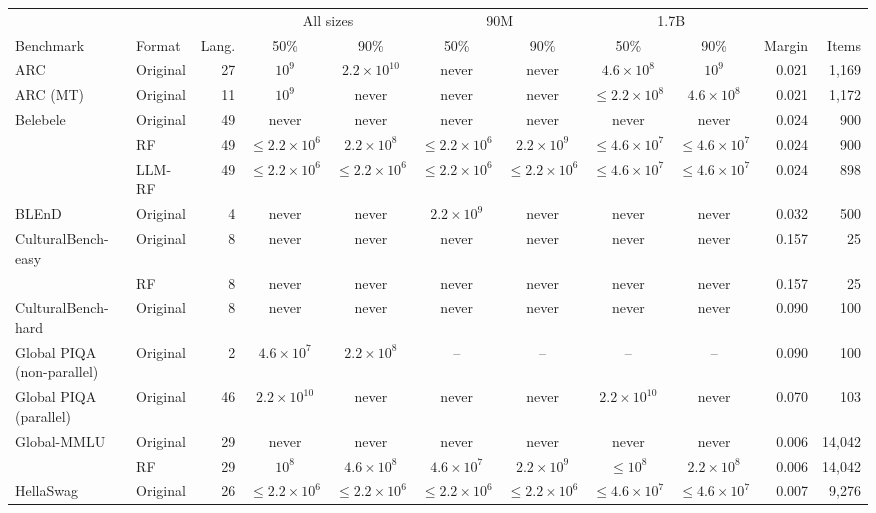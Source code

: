 \begin{tabular}{llrccccccrr}
\toprule
 & & & \multicolumn{2}{c}{All sizes} & \multicolumn{2}{c}{90M} & \multicolumn{2}{c}{1.7B} & & \\
\cmidrule(lr){4-5}\cmidrule(lr){6-7}\cmidrule(lr){8-9}
Benchmark & Format & Lang. & 50\% & 90\% & 50\% & 90\% & 50\% & 90\% & Margin & Items \\
\midrule
ARC & Original & 27 & $10^{9}$ & $2.2\times10^{10}$ & never & never & $4.6\times10^{8}$ & $10^{9}$ & 0.021 & 1{,}169 \\
\addlinespace
ARC (MT) & Original & 11 & $10^{9}$ & never & never & never & $\leq 2.2\times10^{8}$ & $4.6\times10^{8}$ & 0.021 & 1{,}172 \\
\addlinespace
Belebele & Original & 49 & never & never & never & never & never & never & 0.024 & 900 \\
 & RF & 49 & $\leq 2.2\times10^{6}$ & $2.2\times10^{8}$ & $\leq 2.2\times10^{6}$ & $2.2\times10^{9}$ & $\leq 4.6\times10^{7}$ & $\leq 4.6\times10^{7}$ & 0.024 & 900 \\
 & LLM-RF & 49 & $\leq 2.2\times10^{6}$ & $\leq 2.2\times10^{6}$ & $\leq 2.2\times10^{6}$ & $\leq 2.2\times10^{6}$ & $\leq 4.6\times10^{7}$ & $\leq 4.6\times10^{7}$ & 0.024 & 898 \\
\addlinespace
BLEnD & Original & 4 & never & never & $2.2\times10^{9}$ & never & never & never & 0.032 & 500 \\
\addlinespace
CulturalBench-easy & Original & 8 & never & never & never & never & never & never & 0.157 & 25 \\
 & RF & 8 & never & never & never & never & never & never & 0.157 & 25 \\
\addlinespace
CulturalBench-hard & Original & 8 & never & never & never & never & never & never & 0.090 & 100 \\
\addlinespace
Global PIQA (non-parallel) & Original & 2 & $4.6\times10^{7}$ & $2.2\times10^{8}$ & -- & -- & -- & -- & 0.090 & 100 \\
\addlinespace
Global PIQA (parallel) & Original & 46 & $2.2\times10^{10}$ & never & never & never & $2.2\times10^{10}$ & never & 0.070 & 103 \\
\addlinespace
Global-MMLU & Original & 29 & never & never & never & never & never & never & 0.006 & 14{,}042 \\
 & RF & 29 & $10^{8}$ & $4.6\times10^{8}$ & $4.6\times10^{7}$ & $2.2\times10^{9}$ & $\leq 10^{8}$ & $2.2\times10^{8}$ & 0.006 & 14{,}042 \\
\addlinespace
HellaSwag & Original & 26 & $\leq 2.2\times10^{6}$ & $\leq 2.2\times10^{6}$ & $\leq 2.2\times10^{6}$ & $\leq 2.2\times10^{6}$ & $\leq 4.6\times10^{7}$ & $\leq 4.6\times10^{7}$ & 0.007 & 9{,}276 \\

\end{tabular}
